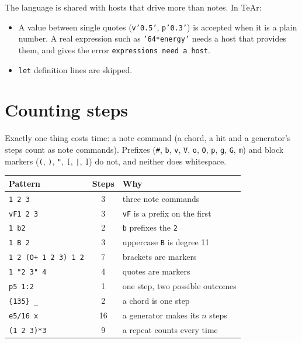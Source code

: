 \documentclass[11pt,a4paper]{article}
\newcommand{\pat}[1]{\texttt{#1}}
\begin{document}
The language is shared with hosts that drive more than notes. In TeAr:

\begin{itemize}[leftmargin=1.5em]
  \item A value between single quotes (\pat{v'0.5'}, \pat{p'0.3'}) is accepted
        when it is a plain number. A real expression such as \pat{'64*energy'}
        needs a host that provides them, and gives the error
        \pat{expressions need a host}.
  \item \pat{let} definition lines are skipped.
\end{itemize}

\section{Counting steps}

Exactly one thing costs time: a note command (a chord, a hit and a generator's
steps count as note commands). Prefixes (\pat{\#}, \pat{b}, \pat{v}, \pat{V},
\pat{o}, \pat{O}, \pat{p}, \pat{g}, \pat{G}, \pat{m}) and block markers
(\pat{(}, \pat{)}, \pat{"}, \pat{[}, \pat{|}, \pat{]}) do not, and neither
does whitespace.

\begin{center}
\begin{tabular}{@{}lcl@{}}
\toprule
\textbf{Pattern} & \textbf{Steps} & \textbf{Why}\\
\midrule
\pat{1 2 3}              & 3  & three note commands\\
\pat{vF1 2 3}            & 3  & \pat{vF} is a prefix on the first\\
\pat{1 b2}               & 2  & \pat{b} prefixes the \pat{2}\\
\pat{1 B 2}              & 3  & uppercase \pat{B} is degree 11\\
\pat{1 2 (O+ 1 2 3) 1 2} & 7  & brackets are markers\\
\pat{1 "2 3" 4}          & 4  & quotes are markers\\
\pat{p5 1:2}             & 1  & one step, two possible outcomes\\
\pat{\{135\} \_}         & 2  & a chord is one step\\
\pat{e5/16 x}           & 16 & a generator makes its $n$ steps\\
\pat{(1 2 3)*3}         & 9  & a repeat counts every time\\
\bottomrule
\end{tabular}
\end{center}
\end{document}
